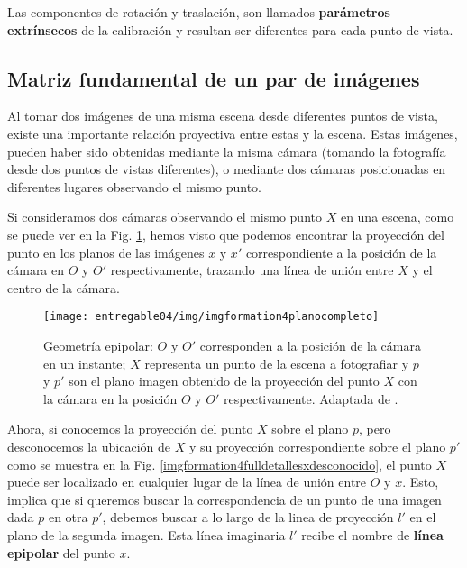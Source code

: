 \documentclass[a4paper,11pt,spanish]{article}
\begin{document}
Las componentes de rotación y traslación, son llamados \textbf{parámetros extrínsecos} de la calibración y resultan ser diferentes para cada punto de vista.

\subsection{Matriz fundamental de un par de imágenes}
\label{subsub_calculo_matriz_fundamental}
Al tomar dos imágenes de una misma escena desde diferentes puntos de vista, existe una importante relación proyectiva entre estas y la escena. Estas imágenes, pueden haber sido obtenidas mediante la misma cámara (tomando la fotografía desde dos puntos de vistas diferentes), o mediante dos cámaras posicionadas en diferentes lugares observando el mismo punto.%

Si consideramos dos cámaras observando el mismo punto $X$ en una escena, como se puede ver en la Fig. \ref{figura_image_formation_4_plano_completo}, hemos visto que podemos encontrar la proyección del punto en los planos de las imágenes $x$ y $x'$ correspondiente a la posición de la cámara en $O$ y $O'$ respectivamente, trazando una línea de unión entre $X$ y el centro de la cámara. 

\begin{figure}[tbhp]
\centerline{\texttt{[image: entregable04/img/imgformation4planocompleto]}}
\caption{Geometría epipolar: $O$ y $O'$ corresponden a la posición de la cámara en un instante; $X$ representa un punto de la escena a fotografiar y $p$ y $p'$ son el plano imagen obtenido de la proyección del punto $X$ con la cámara en la posición $O$ y $O'$ respectivamente. Adaptada de \cite{citeulike:9456628}.}
\label{figura_image_formation_4_plano_completo}
\end{figure}

Ahora, si conocemos la proyección del punto $X$ sobre el plano $p$, pero desconocemos la ubicación de $X$ y su proyección correspondiente sobre el plano $p'$ como se muestra en la Fig. \ref{imgformation4fulldetallesxdesconocido}, el punto $X$ puede ser localizado en cualquier lugar de la línea de unión entre $O$ y $x$. Esto, implica que si queremos buscar la correspondencia de un punto de una imagen dada $p$ en otra $p'$, debemos buscar a lo largo de la linea de proyección $l'$ en el plano de la segunda imagen. Esta línea imaginaria $l'$ recibe el nombre de \textbf{línea epipolar} del punto $x$. 
\end{document}
